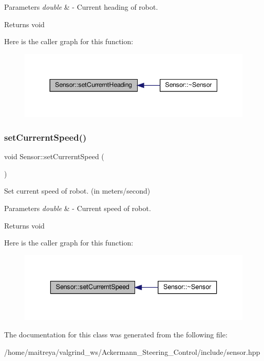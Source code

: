 \begin{DoxyParams}{Parameters}
{\em double} & -\/ Current heading of robot. \\
\hline
\end{DoxyParams}
\begin{DoxyReturn}{Returns}
void 
\end{DoxyReturn}
Here is the caller graph for this function\+:
\nopagebreak
\begin{figure}[H]
\begin{center}
\leavevmode
\includegraphics[width=344pt]{classSensor_ade56b78666a057ce576aad448a2a5ecd_icgraph}
\end{center}
\end{figure}
\mbox{\label{classSensor_ac5cbcf17f5dc8a4d8ca545d657255f54}} 
\subsubsection{\texorpdfstring{set\+Currernt\+Speed()}{setCurrerntSpeed()}}
{\footnotesize\ttfamily void Sensor\+::set\+Currernt\+Speed (\begin{DoxyParamCaption}\item[{double}]{ }\end{DoxyParamCaption})}



Set current speed of robot. (in meters/second) 


\begin{DoxyParams}{Parameters}
{\em double} & -\/ Current speed of robot. \\
\hline
\end{DoxyParams}
\begin{DoxyReturn}{Returns}
void 
\end{DoxyReturn}
Here is the caller graph for this function\+:
\nopagebreak
\begin{figure}[H]
\begin{center}
\leavevmode
\includegraphics[width=336pt]{classSensor_ac5cbcf17f5dc8a4d8ca545d657255f54_icgraph}
\end{center}
\end{figure}


The documentation for this class was generated from the following file\+:\begin{DoxyCompactItemize}
\item 
/home/maitreya/valgrind\+\_\+ws/\+Ackermann\+\_\+\+Steering\+\_\+\+Control/include/sensor.\+hpp\end{DoxyCompactItemize}

